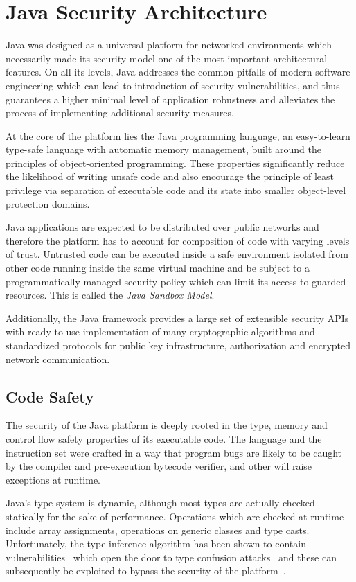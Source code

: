 \documentclass[a4paper,12pt,twoside,openright]{report}
\begin{document}
\section{Java Security Architecture}

Java was designed as a universal platform for networked environments which necessarily made its security model one of the most important architectural features. On all its levels, Java addresses the common pitfalls of modern software engineering which can lead to introduction of security vulnerabilities, and thus guarantees a higher minimal level of application robustness and alleviates the process of implementing additional security measures.

At the core of the platform lies the Java programming language, an easy-to-learn type-safe language with automatic memory management, built around the principles of object-oriented programming. These properties significantly reduce the likelihood of writing unsafe code and also encourage the principle of least privilege via separation of executable code and its state into smaller object-level protection domains.

Java applications are expected to be distributed over public networks and therefore the platform has to account for composition of code with varying levels of trust. Untrusted code can be executed inside a safe environment isolated from other code running inside the same virtual machine and be subject to a programmatically managed security policy which can limit its access to guarded resources. This is called the \emph{Java Sandbox Model}.

Additionally, the Java framework provides a large set of extensible security APIs with ready-to-use implementation of many cryptographic algorithms and standardized protocols for public key infrastructure, authorization and encrypted network communication. 

\subsection{Code Safety}

The security of the Java platform is deeply rooted in the type, memory and control flow safety properties of its executable code. The language and the instruction set were crafted in a way that program bugs are likely to be caught by the compiler and pre-execution bytecode verifier, and other will raise exceptions at runtime. 

\label{section:TypeConfusion}
Java's type system is dynamic, although most types are actually checked statically for the sake of performance. Operations which are checked at runtime include array assignments, operations on generic classes and type casts. Unfortunately, the type inference algorithm has been shown to contain vulnerabilities~\cite{Suenaga:2012:JavaVulnerability} which open the door to type confusion attacks~\cite{Oh:2012:JavaExploitReport} and these can subsequently be exploited to bypass the security of the platform~\cite{McGraw:1999:SJG:298616}.
\end{document}
